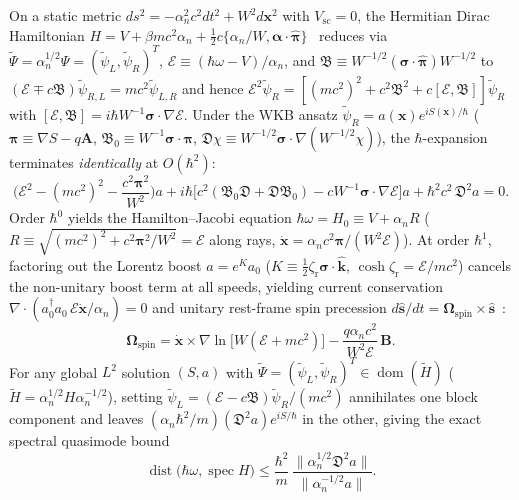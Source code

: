 \documentclass[aps,prd,onecolumn,tightenlines,nofootinbib,notitlepage,10pt,floatfix]{revtex4-2}
\theoremstyle{indentedtheorem}
\begin{document}
On a static metric $ds^2=-\alpha_n^2 c^2 dt^2+W^2 d\mathbf{x}^2$ with $V_\text{sc}=0$, the Hermitian Dirac Hamiltonian $H=V+\beta mc^2\alpha_n+\tfrac{1}{2}c\{\alpha_n/W,\boldsymbol{\alpha}\cdot\hat{\boldsymbol{\pi}}\}$~\citep{ObukhovSilenkoTeryaev2011Dirac} reduces via $\tilde{\Psi}=\alpha_n^{1/2}\Psi=(\tilde{\psi}_L,\tilde{\psi}_R)^T$, $\mathcal{E}\equiv(\hbar\omega-V)/\alpha_n$, and $\mathfrak{B}\equiv W^{-1/2}(\boldsymbol{\sigma}\cdot\hat{\boldsymbol{\pi}})W^{-1/2}$ to $(\mathcal{E}\mp c\mathfrak{B})\tilde{\psi}_{R,L}=mc^2\tilde{\psi}_{L,R}$ and hence $\mathcal{E}^2\tilde{\psi}_R=[(mc^2)^2+c^2\mathfrak{B}^2+c[\mathcal{E},\mathfrak{B}]]\tilde{\psi}_R$ with $[\mathcal{E},\mathfrak{B}]=i\hbar W^{-1}\boldsymbol{\sigma}\cdot\nabla\mathcal{E}$. Under the WKB ansatz $\tilde{\psi}_R=a(\mathbf{x})e^{iS(\mathbf{x})/\hbar}$ ($\boldsymbol{\pi}\equiv\nabla S-q\mathbf{A}$, $\mathfrak{B}_0\equiv W^{-1}\boldsymbol{\sigma}\cdot\boldsymbol{\pi}$, $\mathfrak{D}\chi\equiv W^{-1/2}\boldsymbol{\sigma}\cdot\nabla(W^{-1/2}\chi)$), the $\hbar$-expansion terminates \emph{identically} at $O(\hbar^2)$:
\begin{equation}
    \Big(\mathcal{E}^2-(mc^2)^2-\frac{c^2\boldsymbol{\pi}^2}{W^2}\Big)a + i\hbar\big[c^2(\mathfrak{B}_0\mathfrak{D}+\mathfrak{D}\mathfrak{B}_0)-cW^{-1}\boldsymbol{\sigma}\cdot\nabla\mathcal{E}\big]a + \hbar^2 c^2\,\mathfrak{D}^2 a = 0 .
    \label{eq:residual_exact}
\end{equation}
Order $\hbar^0$ yields the Hamilton--Jacobi equation $\hbar\omega=H_0\equiv V+\alpha_n R$ ($R\equiv\sqrt{(mc^2)^2+c^2\boldsymbol{\pi}^2/W^2}=\mathcal{E}$ along rays, $\dot{\mathbf{x}}=\alpha_n c^2\boldsymbol{\pi}/(W^2\mathcal{E})$). At order $\hbar^1$, factoring out the Lorentz boost $a=e^K a_0$ ($K\equiv\tfrac{1}{2}\zeta_\text{r}\boldsymbol{\sigma}\cdot\hat{\mathbf{k}}$, $\cosh\zeta_\text{r}=\mathcal{E}/mc^2$) cancels the non-unitary boost term at all speeds, yielding current conservation $\nabla\cdot(a_0^\dagger a_0\,\mathcal{E}\dot{\mathbf{x}}/\alpha_n)=0$ and unitary rest-frame spin precession $d\hat{\mathbf{s}}/dt=\boldsymbol{\Omega}_\text{spin}\times\hat{\mathbf{s}}$~\citep{BolteKeppeler1999Semiclassical,SilenkoTeryaev2005Semiclassical,OanceaKumar2023Semiclassical}:
\begin{equation}
    \boldsymbol{\Omega}_\text{spin} = \dot{\mathbf{x}}\times\nabla\ln\big[W(\mathcal{E}+mc^2)\big] - \frac{q\alpha_n c^2}{W^2\mathcal{E}}\,\mathbf{B} .
    \label{eq:spin_rate_all}
\end{equation}
For any global $L^2$ solution $(S,a)$ with $\tilde{\Psi}=(\tilde{\psi}_L,\tilde{\psi}_R)^T\in\operatorname{dom}(\tilde{H})$ ($\tilde{H}=\alpha_n^{1/2}H\alpha_n^{-1/2}$), setting $\tilde{\psi}_L=(\mathcal{E}-c\mathfrak{B})\tilde{\psi}_R/(mc^2)$ annihilates one block component and leaves $(\alpha_n\hbar^2/m)(\mathfrak{D}^2 a)e^{iS/\hbar}$ in the other, giving the exact spectral quasimode bound
\begin{equation}
    \operatorname{dist}\big(\hbar\omega,\operatorname{spec}H\big) \le \frac{\hbar^2}{m}\,\frac{\|\alpha_n^{1/2}\mathfrak{D}^2 a\|}{\|\alpha_n^{-1/2}a\|} .
    \label{eq:quasimode}
\end{equation}
\end{document}

